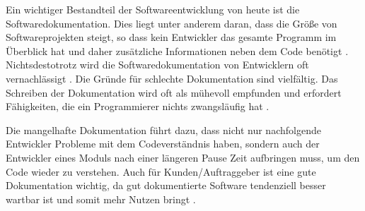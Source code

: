 \label{sec:introduction}

Ein wichtiger Bestandteil der Softwareentwicklung von heute ist die Softwaredokumentation. Dies liegt unter anderem daran, dass die Größe von Softwareprojekten steigt, so dass kein Entwickler das gesamte Programm im Überblick hat und daher zusätzliche Informationen neben dem Code benötigt \cite{StaticAnalysis:AnIntroduction:TheFundamentalChallengeofSoftwareEngineeringisOneofComplexity.}. Nichtsdestotrotz wird die Softwaredokumentation von Entwicklern oft vernachlässigt \cite{Qualityanalysisofsourcecodecomments}.  Die Gründe für schlechte Dokumentation sind vielfältig. Das Schreiben der Dokumentation wird oft als mühevoll empfunden und erfordert Fähigkeiten, die ein Programmierer nichts zwangsläufig hat\cite{AutomaticQualityAssessmentofSourceCodeComments:TheJavadocMiner} \cite{CommentingonCodeConsideringDatasBottleneck}.  

Die mangelhafte Dokumentation führt dazu, dass nicht nur nachfolgende Entwickler Probleme mit dem Codeverständnis haben, sondern auch der Entwickler eines Moduls nach einer längeren Pause Zeit aufbringen muss, um den Code wieder zu verstehen. Auch für Kunden/Auftraggeber ist eine gute Dokumentation wichtig, da gut dokumentierte Software tendenziell besser wartbar ist und somit mehr Nutzen bringt \cite{Qualityanalysisofsourcecodecomments}\cite{SoftwareDocumentationManagementIssuesandPractices:ASurvey}.



